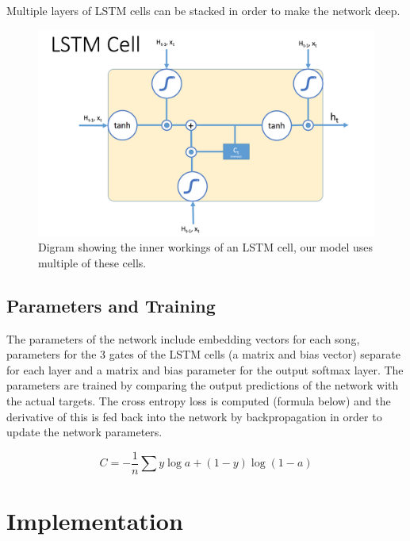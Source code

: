 \documentclass{article} %
\begin{document}
Multiple layers of LSTM cells can be stacked in order to make the network deep. 
\begin{figure}
\label{fig:LSTM_cell}
	\begin{center}
		\includegraphics[scale = 0.4]{"../images/LSTM_cell"}
		\caption{Digram showing the inner workings of an LSTM cell, our model uses multiple of these cells.}
	\end{center}
\end{figure}

\subsection{Parameters and Training}
The parameters of the network include embedding vectors for each song, parameters for the 3 gates of the LSTM cells (a matrix and bias vector) separate for each layer and a matrix and bias parameter for the output softmax layer. The parameters are trained by comparing the output predictions of the network with the actual targets. The cross entropy loss is computed (formula below) and the derivative of this is fed back into the network by backpropagation in order to update the network parameters. \cite{NN_deeplearning}

\begin{equation}
C = -\frac{1}{n} \sum y \log a + (1 - y) \log(1-a)
\end{equation}

\section{Implementation}
\end{document}
